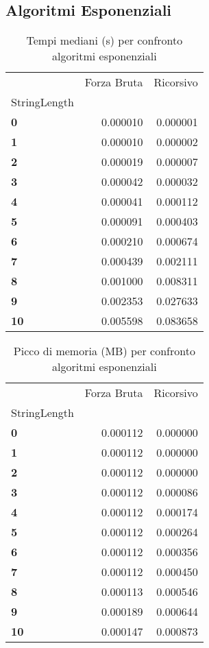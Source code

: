 \documentclass[a4paper, 11pt]{article}
\begin{document}
\subsection{Algoritmi Esponenziali}
\begin{center}
\begin{table}[H]
\caption{Tempi mediani (s) per confronto algoritmi esponenziali}
\label{tab:confronto_tempi_esponenziali}
\begin{tabular}{l|r|r}
\toprule
 & Forza Bruta & Ricorsivo \\
StringLength &  &  \\
\midrule
\textbf{0} & 0.000010 & 0.000001 \\
\textbf{1} & 0.000010 & 0.000002 \\
\textbf{2} & 0.000019 & 0.000007 \\
\textbf{3} & 0.000042 & 0.000032 \\
\textbf{4} & 0.000041 & 0.000112 \\
\textbf{5} & 0.000091 & 0.000403 \\
\textbf{6} & 0.000210 & 0.000674 \\
\textbf{7} & 0.000439 & 0.002111 \\
\textbf{8} & 0.001000 & 0.008311 \\
\textbf{9} & 0.002353 & 0.027633 \\
\textbf{10} & 0.005598 & 0.083658 \\
\bottomrule
\end{tabular}
\end{table}
\end{center}

\begin{center}
\begin{table}[H]
\caption{Picco di memoria (MB) per confronto algoritmi esponenziali}
\label{tab:confronto_memoria_esponenziale}
\begin{tabular}{l|r|r}
\toprule
 & Forza Bruta & Ricorsivo \\
StringLength &  &  \\
\midrule
\textbf{0} & 0.000112 & 0.000000 \\
\textbf{1} & 0.000112 & 0.000000 \\
\textbf{2} & 0.000112 & 0.000000 \\
\textbf{3} & 0.000112 & 0.000086 \\
\textbf{4} & 0.000112 & 0.000174 \\
\textbf{5} & 0.000112 & 0.000264 \\
\textbf{6} & 0.000112 & 0.000356 \\
\textbf{7} & 0.000112 & 0.000450 \\
\textbf{8} & 0.000113 & 0.000546 \\
\textbf{9} & 0.000189 & 0.000644 \\
\textbf{10} & 0.000147 & 0.000873 \\
\bottomrule
\end{tabular}
\end{table}
\end{center}
\end{document}
